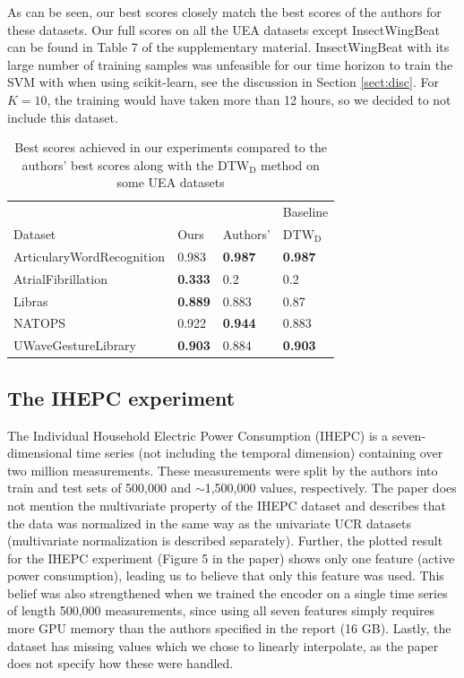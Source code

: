 \documentclass{article}
\begin{document}
As can be seen, our best scores closely match the best scores of the authors for these datasets. Our full scores on all the UEA datasets except InsectWingBeat can be found in Table 7 of the supplementary material. InsectWingBeat with its large number of training samples was unfeasible for our time horizon to train the SVM with when using scikit-learn, see the discussion in Section \ref{sect:disc}. For $K=10$, the training would have taken more than 12 hours, so we decided to not include this dataset.


\begin{table}[h!]
\caption{Best scores achieved in our experiments compared to the authors' best scores along with the $\mathrm{DTW_D}$ method on some UEA datasets}
\label{tab:uea}
\centering
\begin{tabular}{llll}
    \hline
               &       &          & \vrule Baseline \\
    
    Dataset          & Ours  & Authors' &\vrule $\mathrm{DTW_D}$  \\
    \hline
    ArticularyWordRecognition & 0.983           & \textbf{0.987}    & \textbf{0.987} \\
    AtrialFibrillation        & \textbf{0.333}   & 0.2      & 0.2   \\
    Libras                    & \textbf{0.889} & 0.883             & 0.87           \\
    NATOPS                    & 0.922 & \textbf{0.944}    & 0.883          \\
    UWaveGestureLibrary       & \textbf{0.903}          & 0.884             & \textbf{0.903}
\end{tabular}
\end{table}


\subsection{The IHEPC experiment}
\label{ihepc}
The Individual Household Electric Power Consumption (IHEPC) is a seven-dimensional time series (not including the temporal dimension) containing over two million measurements. These measurements were split by the authors into train and test sets of 500,000 and $\sim$1,500,000 values, respectively. The paper does not mention the multivariate property of the IHEPC dataset and describes that the data was normalized in the same way as the univariate UCR datasets (multivariate normalization is described separately). Further, the plotted result for the IHEPC experiment (Figure 5 in the paper) shows only one feature (active power consumption), leading us to believe that only this feature was used. This belief was also strengthened when we trained the encoder on a single time series of length 500,000 measurements, since using all seven features simply requires more GPU memory than the authors specified in the report (16 GB). Lastly, the dataset has missing values which we chose to linearly interpolate, as the paper does not specify how these were handled.
\end{document}
